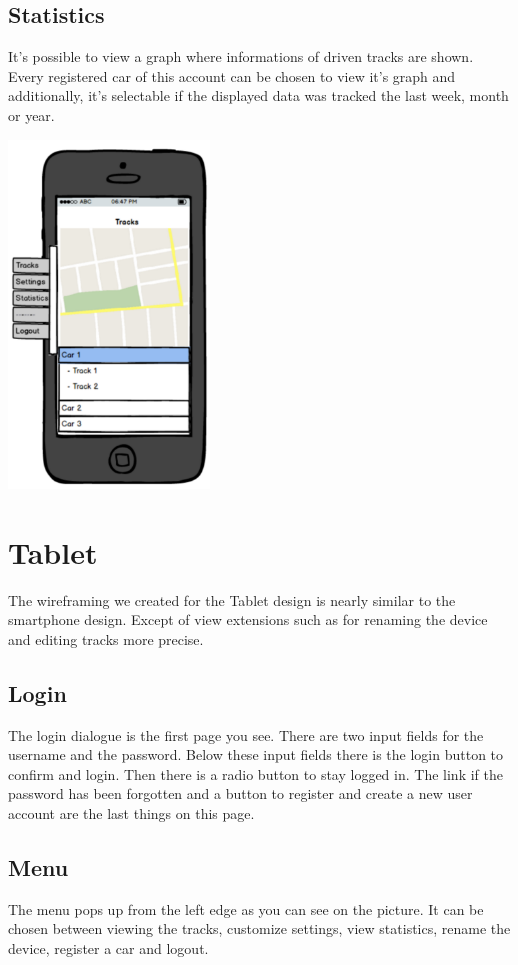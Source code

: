 \subsection{Statistics}
It’s possible to view a graph where informations of driven tracks are shown. Every registered car of this account can be chosen to view it’s graph and additionally, it’s selectable if the displayed data was tracked the last week, month or year.
\begin{center}
\includegraphics[width=0.4\textwidth]{Smartphone}
\end{center}
\section{Tablet}
The wireframing we created for the Tablet design is nearly similar to the smartphone design. Except of view extensions such as for renaming the device and editing tracks more precise.
\subsection{Login}
The login dialogue is the first page you see. There are two input fields for the username and the password. Below these input fields there is the login button to confirm and login. Then there is a radio button to stay logged in.
The link if the password has been forgotten and a button to register and create a new user account are the last things on this page.
\subsection{Menu}
The menu pops up from the left edge as you can see on the picture. It can be chosen between viewing the tracks, customize settings, view statistics, rename the device, register a car and logout.
